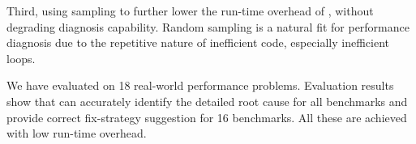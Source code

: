 Third, using sampling to further lower the run-time overhead of \Tool, without
degrading diagnosis capability. Random sampling is a natural fit for performance
diagnosis due to the repetitive nature of inefficient code, especially
inefficient loops.

We have evaluated \Tool on 18 real-world performance problems. 
Evaluation results show that \Tool can accurately identify the detailed
root cause for all benchmarks and provide correct fix-strategy suggestion for
16 benchmarks. All these are achieved with low run-time overhead.
